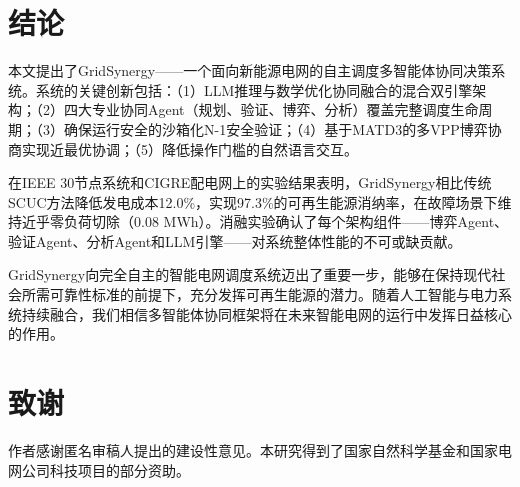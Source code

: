 \documentclass[conference]{IEEEtran}
\begin{document}
\section{结论}

本文提出了GridSynergy——一个面向新能源电网的自主调度多智能体协同决策系统。系统的关键创新包括：（1）LLM推理与数学优化协同融合的混合双引擎架构；（2）四大专业协同Agent（规划、验证、博弈、分析）覆盖完整调度生命周期；（3）确保运行安全的沙箱化N-1安全验证；（4）基于MATD3的多VPP博弈协商实现近最优协调；（5）降低操作门槛的自然语言交互。

在IEEE 30节点系统和CIGRE配电网上的实验结果表明，GridSynergy相比传统SCUC方法降低发电成本12.0\%，实现97.3\%的可再生能源消纳率，在故障场景下维持近乎零负荷切除（0.08 MWh）。消融实验确认了每个架构组件——博弈Agent、验证Agent、分析Agent和LLM引擎——对系统整体性能的不可或缺贡献。

GridSynergy向完全自主的智能电网调度系统迈出了重要一步，能够在保持现代社会所需可靠性标准的前提下，充分发挥可再生能源的潜力。随着人工智能与电力系统持续融合，我们相信多智能体协同框架将在未来智能电网的运行中发挥日益核心的作用。

\section*{致谢}

作者感谢匿名审稿人提出的建设性意见。本研究得到了国家自然科学基金和国家电网公司科技项目的部分资助。
\end{document}
